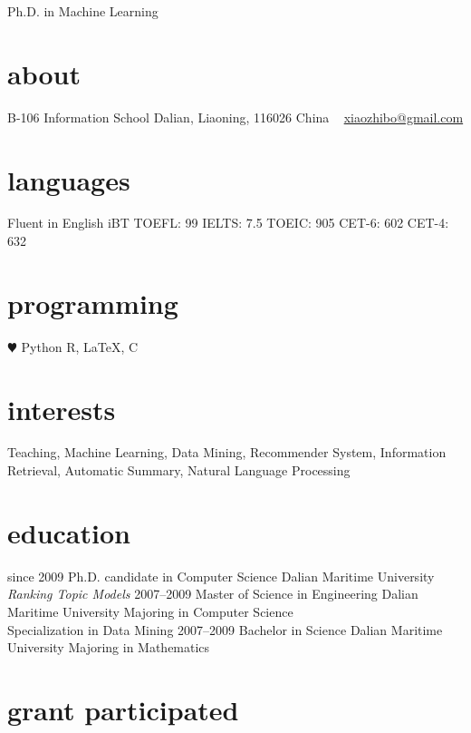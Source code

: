 \documentclass[]{friggeri-cv}
\begin{document}
       {Ph.D. in Machine Learning}


\begin{aside}
  \section{about}
    B-106
    Information School
    Dalian, Liaoning, 116026
    China
    ~
    \href{mailto:xiaozhibo@gmail.com}{xiaozhibo@gmail.com}
  \section{languages}
    Fluent in English
    iBT TOEFL: 99
    IELTS: 7.5
    TOEIC: 905
    CET-6: 602
    CET-4: 632
  \section{programming}
    {\color{red} $\varheartsuit$} Python
    R, \LaTeX, C
\end{aside}

\section{interests}

Teaching,
Machine Learning, Data Mining, Recommender System, Information Retrieval,
Automatic Summary, Natural Language Processing


\section{education}

\begin{entrylist}
  \entry
    {since 2009}
    {Ph.D. {\normalfont candidate in Computer Science}}
    {Dalian Maritime University}
    {\emph{Ranking Topic Models}}
  \entry
    {2007–2009}
    {Master of Science in Engineering}
    {Dalian Maritime University}
    {Majoring in Computer Science\\
    Specialization in Data Mining}
  \entry
    {2007–2009}
    {Bachelor in Science}
    {Dalian Maritime University}
    {Majoring in Mathematics}
\end{entrylist}

\section{grant participated}
\end{document}
